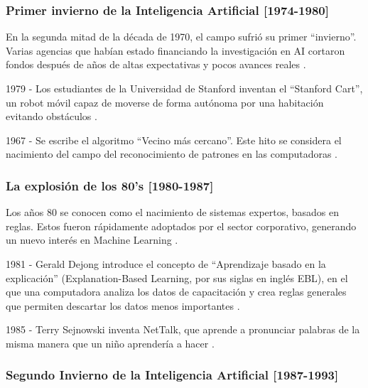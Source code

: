 \subsubsection{Primer invierno de la Inteligencia Artificial [1974-1980] }


En la segunda mitad de la década de 1970, el campo sufrió su primer ``invierno''. Varias agencias que habían estado financiando la investigación en AI cortaron fondos después de años de altas expectativas y pocos avances reales \cite{V.Gonzalez}.
\\ \par
1979 - Los estudiantes de la Universidad de Stanford inventan el ``Stanford Cart'', un robot móvil capaz de moverse de forma autónoma por una habitación evitando obstáculos \cite{V.Gonzalez}.
\\ \par
1967 - Se escribe el algoritmo ``Vecino más cercano''. Este hito se considera el nacimiento del campo del reconocimiento de patrones en las computadoras \cite{V.Gonzalez}. 
\\ \par

\subsubsection{La explosión de los 80's [1980-1987]}

Los años 80 se conocen como el nacimiento de sistemas expertos, basados en reglas. Estos fueron rápidamente adoptados por el sector corporativo, generando un nuevo interés en Machine Learning \cite{V.Gonzalez}.
\\ \par
1981 - Gerald Dejong introduce el concepto de ``Aprendizaje basado en la explicación'' (Explanation-Based Learning, por sus siglas en inglés EBL), en el que una computadora analiza los datos de capacitación y crea reglas generales que permiten descartar los datos menos importantes \cite{V.Gonzalez}.
\\ \par
1985 - Terry Sejnowski inventa NetTalk, que aprende a pronunciar palabras de la misma manera que un niño aprendería a hacer \cite{V.Gonzalez}.
\\ \par
\subsubsection{Segundo Invierno de la Inteligencia Artificial [1987-1993]}

